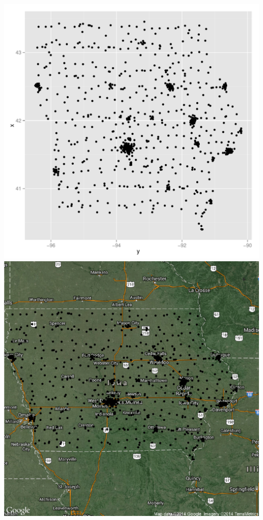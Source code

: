 \documentclass{article}\usepackage[]{graphicx}\usepackage[]{color}
\makeatletter
\def\maxwidth{ %
  \ifdim\Gin@nat@width>\linewidth
    \linewidth
  \else
    \Gin@nat@width
  \fi
}
\newenvironment{knitrout}{}{} %
\makeatother
\begin{document}
\begin{itemize}
\begin{knitrout}
{\centering \includegraphics[width=\maxwidth]{figure/minimal-census1} 
\includegraphics[width=\maxwidth]{figure/minimal-census2} 
}
\end{knitrout}
\end{itemize}
\end{document}
